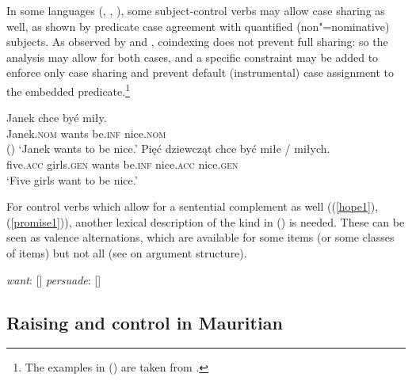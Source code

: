 \documentclass[output=paper
	        ,collection
	        ,collectionchapter
 	        ,biblatex
                ,babelshorthands
                ,newtxmath
                ,draftmode
                ,colorlinks, citecolor=brown
]{langscibook}
\begin{document}
In some  languages (, , ), some subject-control
verbs may allow case sharing as well, as shown by predicate case agreement with quantified
(non"=nominative) subjects. As observed by \citet{Przepiorkowski2004} and
\citet{PrzepiorkowskiandRosen2005}, coindexing does not prevent full sharing: so the analysis may
allow for both cases, and a specific constraint may be added to enforce only case sharing and
prevent default (instrumental) case assignment to the embedded predicate.\footnote{%
   The examples in () are taken from .
}

\begin{exe}
\ex \begin{xlist}
\ex 
\gll Janek chce byé miły.\\
     Janek.\textsc{nom} wants be.\textsc{inf} nice.\textsc{nom} \\ \hfill()
\glt `Janek wants to be nice.'
\ex 
\gll Pięć dziewcząt chce być miłe / miłych. \\
     five.\textsc{acc} girls.\textsc{gen} wants be.\textsc{inf} nice.\textsc{acc} {} nice.\textsc{gen}\\
\glt `Five girls want to be nice.'
	\end{xlist}
		
\end{exe}


For control verbs which allow for a sentential complement as well ((\ref{hope1}), (\ref{promise1})),
another lexical description of the kind in () is needed. These can be seen as valence alternations, which are
available for some items (or some classes of items) but not all (see  on argument structure).

\eal
\ex \emph{want}: [\argst {}]
\ex \emph{persuade}: [\argst {}]
\zl




\subsection{Raising and control in Mauritian} \label{sec-maurit}
\end{document}
